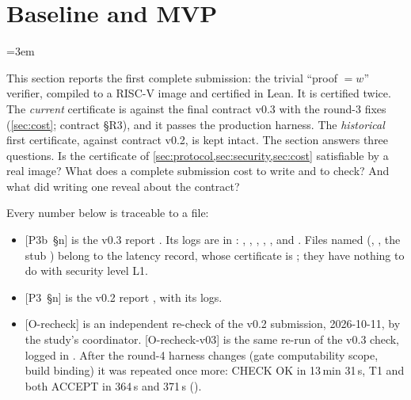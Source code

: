\section{Baseline and MVP}\label{sec:baseline}
\begingroup\emergencystretch=3em

This section reports the first complete submission: the trivial ``proof $=w$'' verifier, compiled to a
RISC-V image and certified in Lean. It is certified twice. The \emph{current} certificate is against
the final contract v0.3 with the round-3 fixes (\cref{sec:cost}; contract  §R3), and it
passes the production harness. The \emph{historical} first certificate, against contract v0.2, is kept
intact. The section answers three questions. Is the certificate of
\cref{sec:protocol,sec:security,sec:cost} satisfiable by a real image? What does a complete
submission cost to write and to check? And what did writing one reveal about the contract?

Every number below is traceable to a file:
\begingroup\raggedright
\begin{itemize}[nosep]
\item {}[P3b~§n] is the v0.3 report . Its logs are in
  : , ,
  , , ,  and .
  Files named  (, , the stub )
  belong to the latency record, whose certificate is ; they have nothing to do with
  security level L1.
\item {}[P3~§n] is the v0.2 report , with its logs.
\item {}[O-recheck] is an independent re-check of the v0.2 submission, 2026-10-11, by the study's
  coordinator. {}[O-recheck-v03] is the same re-run of the v0.3 check, logged in
  . After the round-4 harness changes (gate
  computability scope, build binding) it was repeated once more: CHECK OK in 13\,min 31\,s, T1 and
   both ACCEPT in 364\,s and 371\,s ().
\end{itemize}
\endgroup

